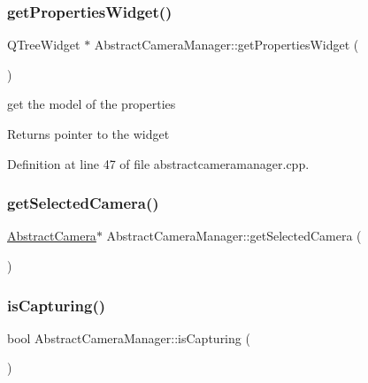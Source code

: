 \mbox{\label{class_abstract_camera_manager_a8cfcc9f2156936f1d8faea55ad97eeab}} 
\subsubsection{\texorpdfstring{getPropertiesWidget()}{getPropertiesWidget()}}
{\footnotesize\ttfamily Q\+Tree\+Widget $\ast$ Abstract\+Camera\+Manager\+::get\+Properties\+Widget (\begin{DoxyParamCaption}{ }\end{DoxyParamCaption})}



get the model of the properties 

\begin{DoxyReturn}{Returns}
pointer to the widget 
\end{DoxyReturn}


Definition at line 47 of file abstractcameramanager.\+cpp.

\mbox{\label{class_abstract_camera_manager_a4bcb266a61c634e5f65a653f217f994c}} 
\subsubsection{\texorpdfstring{getSelectedCamera()}{getSelectedCamera()}}
{\footnotesize\ttfamily \mbox{\hyperlink{class_abstract_camera}{Abstract\+Camera}}$\ast$ Abstract\+Camera\+Manager\+::get\+Selected\+Camera (\begin{DoxyParamCaption}{ }\end{DoxyParamCaption})\hspace{0.3cm}{\ttfamily [protected]}}

\mbox{\label{class_abstract_camera_manager_a12c4528190897eecd744e9508430910d}} 
\subsubsection{\texorpdfstring{isCapturing()}{isCapturing()}}
{\footnotesize\ttfamily bool Abstract\+Camera\+Manager\+::is\+Capturing (\begin{DoxyParamCaption}{ }\end{DoxyParamCaption})\hspace{0.3cm}{\ttfamily [inline]}}




